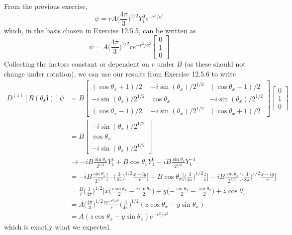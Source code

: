 \documentclass[../principles-of-quantum-mechanics.tex]{subfiles}
\begin{document}
\begin{questions}
		\begin{solution}
			From the previous exercise, 
			$$\psi = rA\Big(\frac{4\pi}{3}\Big)^{1/2}Y_1^0e^{-r^2/a^2}$$
			which, in the basis chosen in Exercise 12.5.5, can be written as
			$$\psi = A\Big(\frac{4\pi}{3}\Big)^{1/2}re^{-r^2/a^2}\begin{bmatrix}0 \\ 1 \\ 0\end{bmatrix}$$
			Collecting the factors constant or dependent on $r$ under $B$ (as these should not change under rotation), we can use our results from Exercise 12.5.6 to write
			\begin{align*}
				D^{(1)}[R(\theta_x\mathbf{i})]\psi &= B\begin{bmatrix}
					(\cos\theta_x + 1)/2 & -i\sin(\theta_x)/2^{1/2} & (\cos\theta_x - 1)/2 \\
					-i\sin(\theta_x)/2^{1/2} & \cos\theta_x & -i\sin(\theta_x)/2^{1/2} \\
					(\cos\theta_x - 1)/2 & -i\sin(\theta_x)/2^{1/2} & (\cos\theta_x+ 1)/2
				\end{bmatrix}\begin{bmatrix}0 \\ 1 \\0\end{bmatrix} \\
				&= B\begin{bmatrix}
					-i\sin(\theta_x)/2^{1/2} \\ \cos\theta_x \\ -i\sin(\theta_x)/2^{1/2}
				\end{bmatrix} \\
				&\to -iB\frac{\sin\theta_x}{2^{1/2}}Y_1^1 + B\cos\theta_x Y_1^0 - iB\frac{\sin\theta_x}{2^{1/2}}Y_1^{-1} \\
				&= -iB\frac{\sin\theta_x}{2^{1/2}}\Big[{-\Big(\frac{3}{8\pi}\Big)^{1/2}}\frac{x+ iy}{r}\Big] + B\cos\theta_x\Big[\Big(\frac{3}{4\pi}\Big)^{1/2}\frac{z}{r}\Big] - iB\frac{\sin\theta_x}{2^{1/2}}\Big[\Big(\frac{3}{8\pi}\Big)^{1/2}\frac{x- iy}{r}\Big] \\
				&= \frac{B}{r}\Big(\frac{3}{4\pi}\Big)^{1/2}\Big[x\Big(\frac{i\sin\theta_x}{2} - \frac{i\sin\theta_x}{2}\Big) + y\Big({-\frac{\sin\theta_x}{2}} - \frac{\sin\theta_x}{2}\Big) + z\cos\theta_x\Big] \\
				&= A\Big(\frac{4\pi}{3}\Big)^{1/2}\frac{re^{-r^2/a^2}}{r}\Big(\frac{3}{4\pi}\Big)^{1/2}(z\cos\theta_x - y\sin\theta_x) \\
				&= A(z\cos\theta_x - y\sin\theta_x)e^{-r^2/a^2}
			\end{align*}
			which is exactly what we expected.
		\end{solution}
	\end{questions}
\end{document}
